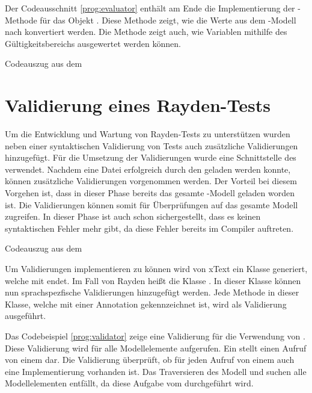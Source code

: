 \SuperPar
Der Codeausschnitt \ref{prog:evaluator} enthält am Ende die Implementierung der -Methode für das Objekt . Diese Methode zeigt, wie die Werte aus dem -Modell nach  konvertiert werden. Die Methode zeigt auch, wie Variablen mithilfe des Gültigkeitsbereichs ausgewertet werden können.

\begin{program}

\caption{Codeauszug aus dem }
\label{prog:evaluator}
\end{program}

\clearpage
\section{Validierung eines Rayden-Tests}
\label{cha:validateKeyword}

Um die Entwicklung und Wartung von Rayden-Tests zu unterstützen wurden neben einer syntaktischen Validierung von Tests auch zusätzliche Validierungen hinzugefügt. Für die Umsetzung der Validierungen wurde eine Schnittstelle des  verwendet. Nachdem eine Datei erfolgreich durch den  geladen werden konnte, können zusätzliche Validierungen vorgenommen werden. Der Vorteil bei diesem Vorgehen ist, dass in dieser Phase bereits das gesamte -Modell geladen worden ist. Die Validierungen können somit für Überprüfungen auf das gesamte Modell zugreifen. In dieser Phase ist auch schon sichergestellt, dass es keinen syntaktischen Fehler mehr gibt, da diese Fehler bereits im Compiler auftreten.

\begin{program}

\caption{Codeauszug aus dem }
\label{prog:validator}
\end{program}

\SuperPar
Um Validierungen implementieren zu können wird von xText ein Klasse generiert, welche mit  endet. Im Fall von Rayden heißt die Klasse . In dieser Klasse können nun sprachspezfische Validierungen hinzugefügt werden. Jede Methode in dieser Klasse, welche mit einer  Annotation gekennzeichnet ist, wird als Validierung ausgeführt. 

\SuperPar
Das Codebeispiel \ref{prog:validator} zeige eine Validierung für die Verwendung von . Diese Validierung wird für alle  Modellelemente aufgerufen. Ein  stellt einen Aufruf von einem  dar. Die Validierung überprüft, ob für jeden Aufruf von einem  auch eine Implementierung vorhanden ist. Das Traversieren des Modell und suchen alle Modellelementen entfällt, da diese Aufgabe vom  durchgeführt wird.

